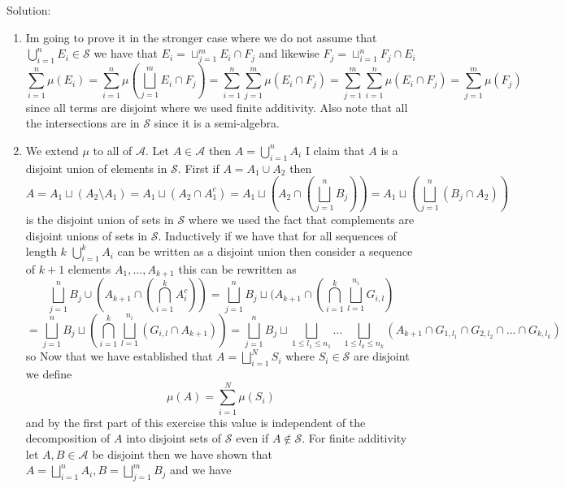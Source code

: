 \documentclass[11pt]{article}
\newcommand{\solution}[1]{{{\textcolor{header}{Solution:} \textcolor{solution}{#1}}}}
\begin{document}
\solution{
    \begin{enumerate}
        \item
            Im going to prove it in the stronger case where we do not assume that $\bigcup_{i=1}^{n}E_i \in \mathcal{S}$
            we have that $E_i = \sqcup_{j=1}^{m} E_i \cap F_j$ and likewise $F_j = \sqcup_{i=1}^{n} F_j \cap E_i$
            \[
                \sum_{i=1}^{n}\mu(E_i) = \sum_{i=1}^{n}\mu(\bigsqcup_{j=1}^{m}E_i \cap F_j) = \sum_{i=1}^{n}\sum_{j=1}^{m} \mu(E_i \cap F_j) = \sum_{j=1}^{m}\sum_{i=1}^{n}\mu(E_i \cap F_j) = \sum_{j=1}^{m} \mu(F_j)
            \] 
            since all terms are disjoint where we used finite additivity. Also note that all the intersections are in $\mathcal{S}$ since it is a semi-algebra.
        \item We extend $\mu$ to all of $ \mathcal{A}$. Let $A \in \mathcal{A}$ then $A = \bigcup_{i=1}^{n}A_i$ 
            I claim that $A$ is a disjoint union of elements in $ \mathcal{S}$. First if $A = A_1 \cup A_2$ then
            \[
                A = A_1 \sqcup (A_2 \setminus A_1) = A_1 \sqcup (A_2 \cap A_1^{c}) = A_1 \sqcup (A_2 \cap (\bigsqcup_{j=1}^{n} B_j)) = A_1 \sqcup (\bigsqcup_{j=1}^{n}(B_j \cap A_2))
            \] 
            is the disjoint union of sets in $\mathcal{S}$ where we used the fact that complements are disjoint unions of sets in  $\mathcal{S}$.
            Inductively if we have that for all sequences of length  $k$  $\bigcup_{i=1}^{k}A_i$ can be written as a disjoint union then consider a sequence of $k+1$ elements  $A_1,\dots,A_{k+1}$ this can be rewritten as
            \[
                \bigsqcup_{j=1}^{n}B_j \cup (A_{k+1} \cap (\bigcap_{i=1}^{k}A_i^{c})) = \bigsqcup_{j=1}^{n}B_j \sqcup (A_{k+1} \cap (\bigcap_{i=1}^{k}\bigsqcup_{l=1}^{n_i} G_{i,l}) 
            \] 
            \[
                = \bigsqcup_{j=1}^{n}B_j \sqcup (\bigcap_{i=1}^{k}\bigsqcup_{l=1}^{n_i}(G_{i,l} \cap A_{k+1})) = \bigsqcup_{j=1}^{n}B_j \sqcup \bigsqcup_{1 \le l_1 \le n_1} \dots \bigsqcup_{1 \le l_k \le n_k} (A_{k+1} \cap G_{1,l_1} \cap G_{2,l_2} \cap \dots \cap G_{k,l_k})
            \] 
            so Now that we have established that $A = \bigsqcup_{i=1}^{N}S_i$ where $S_i \in \mathcal{S}$ are disjoint we define
             \[
            \mu(A) = \sum_{i=1}^{N}\mu(S_i)
            \] 
            and by the first part of this exercise this value is independent of the decomposition of $A$ into disjoint sets of $\mathcal{S}$ even if $A \not\in \mathcal{S}$.
            For finite additivity let $A, B \in \mathcal{A}$ be disjoint then we have shown that $A = \bigsqcup_{i=1}^{n}A_i, B = \bigsqcup_{j=1}^{m}B_j$ and we have

\end{enumerate}}
\end{document}
